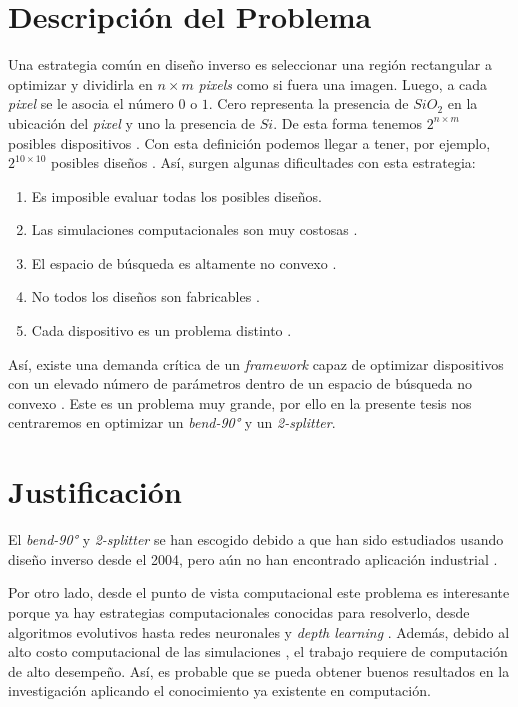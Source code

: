 \section{Descripción del  Problema}

Una estrategia común en diseño inverso es seleccionar una región rectangular a optimizar y dividirla en $n \times m$ \emph{
  pixels} como si fuera una imagen. 
Luego, a cada \emph{pixel} se le asocia el número $0$ o $1$. 
Cero representa la presencia de $SiO_2$ en la ubicación del \emph{pixel} y uno la presencia de $Si$.
De esta forma tenemos $2^{n \times m}$ posibles dispositivos \citep{Su2020}. 
Con esta definición podemos llegar a tener, por ejemplo, $2^{10 \times 10}$ posibles diseños \citep{Malheiros-Silveira2020}.
Así, surgen algunas dificultades con esta estrategia:

\begin{enumerate}
  \item Es imposible evaluar todas los posibles diseños.
  \item Las simulaciones computacionales son muy costosas \citep{Kudyshev2020}.
  \item El espacio de búsqueda es altamente no convexo \citep{Su2018}.
  \item No todos los diseños son fabricables \citep{Su2020}.
  \item Cada dispositivo es un problema distinto \citep{Molesky2018}.
\end{enumerate}


Así, existe una demanda crítica de un \emph{framework} capaz de optimizar dispositivos con un elevado número de parámetros dentro de un espacio de búsqueda no convexo \citep{Kudyshev2020}. Este es un problema muy grande, por ello en la presente tesis nos centraremos en optimizar un \emph{bend-90°} y un \emph{2-splitter}.


\section{Justificación}

El \emph{bend-90°} y \emph{2-splitter} se han escogido debido a que han sido estudiados usando diseño inverso desde el 2004, pero aún no han encontrado aplicación industrial \citep{Molesky2018}. 

Por otro lado, desde el punto de vista computacional este problema es interesante porque ya hay estrategias computacionales conocidas para resolverlo, desde algoritmos evolutivos \citep{Hansen2016} hasta redes neuronales \citep{Goodfellow2015} y \emph{depth learning} \citep{Malkiel2018}. 
Además, debido al alto costo computacional de las simulaciones \citep{Schneider2019}, el trabajo requiere de computación de alto desempeño.
Así, es probable que se pueda obtener buenos resultados en la investigación aplicando el conocimiento ya existente en computación.

